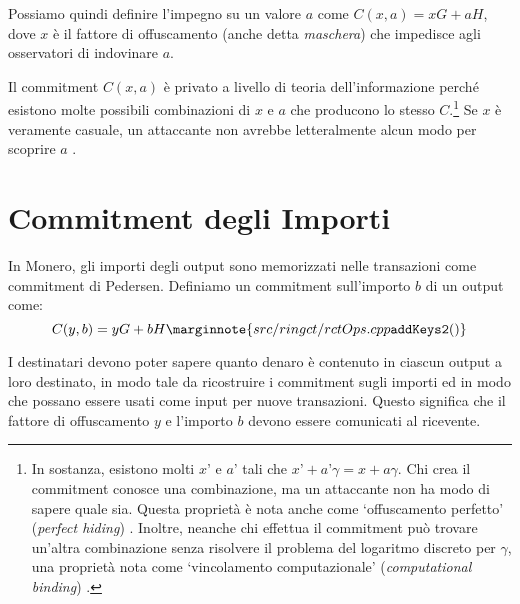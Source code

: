 
Possiamo quindi definire l’impegno su un valore \(a\) come \(C(x, a) = x G + a H\), dove \(x\) è il fattore di offuscamento (anche detta \emph{maschera}) che impedisce agli osservatori di indovinare $a$.

Il commitment $C(x, a)$ è privato a livello di teoria dell'informazione perché esistono molte possibili combinazioni di $x$ e $a$ che producono lo stesso $C$.\footnote{In sostanza, esistono molti $x’$ e $a’$ tali che $x’ + a’ \gamma = x + a \gamma$. Chi crea il commitment conosce una combinazione, ma un attaccante non ha modo di sapere quale sia. Questa proprietà è nota anche come `offuscamento perfetto' (\emph{perfect hiding}) \cite{adam-zero-to-bulletproofs}. Inoltre, neanche chi effettua il commitment può trovare un’altra combinazione senza risolvere il problema del logaritmo discreto per $\gamma$, una proprietà nota come `vincolamento computazionale' (\emph{computational binding}) \cite{adam-zero-to-bulletproofs}.} Se $x$ è veramente casuale, un attaccante non avrebbe letteralmente alcun modo per scoprire $a$ \cite{maxwell-ct, SCOZZAFAVA1993313}.%



\section{Commitment degli Importi}
\label{sec:pedersen_monero}

In Monero, gli importi degli output sono memorizzati nelle transazioni come commitment di Pedersen. Definiamo un commitment sull'importo $b$ di un output come:\vspace{.175cm}
\[C(y,b) = y G + b H\marginnote{src/ringct/ rctOps.cpp {\tt addKeys2()}}\]

I destinatari devono poter sapere quanto denaro è contenuto in ciascun output a loro destinato, in modo tale da ricostruire i commitment sugli importi ed in modo che possano essere usati come input per nuove transazioni. Questo significa che il fattore di offuscamento $y$ e l’importo $b$ devono essere comunicati al ricevente.

